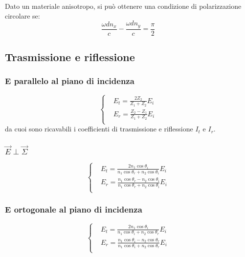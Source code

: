 \documentclass{article}
\begin{document}
Dato un materiale anisotropo, si può ottenere una condizione di polarizzazione circolare se:
\begin{equation}
    \frac{\omega d n_x}{c} -  \frac{\omega d n_y}{c}= \frac{\pi}{2}
\end{equation}


\subsection{Trasmissione e riflessione}
\subsubsection{E parallelo al piano di incidenza}
\begin{equation}
    \left\{
    \begin{aligned}
        & E_t= \frac{2Z_2}{Z_1+Z_2}E_i \\
        & E_r= \frac{Z_2-Z_1}{Z_1+Z_2}E_i\\
    \end{aligned}
    \right.
\end{equation}
da cuoi sono ricavabili i coefficienti di trasmissione e riflessione $I_t$ e $I_r$.

\subsubsection{$\Vec{E}\perp\Vec{\Sigma}$ }
\begin{equation}
    \left\{
    \begin{aligned}
        & E_t= \frac{2n_1\cos{\theta_i}}{n_1\cos{\theta_r}+n_2\cos{\theta_i}}E_i \\
        & E_r= \frac{n_1\cos{\theta_r}-n_2\cos{\theta_i}}{n_1\cos{\theta_r}+n_2\cos{\theta_i}} E_i\\
    \end{aligned}
    \right.
\end{equation}

\subsubsection{E ortogonale al piano di incidenza}
\begin{equation}
    \left\{
    \begin{aligned}
        & E_t= \frac{2n_1\cos{\theta_i}}{n_1\cos{\theta_i}+n_2\cos{\theta_r}}E_i \\
        & E_r= \frac{n_1\cos{\theta_i}-n_2\cos{\theta_r}}{n_1\cos{\theta_i}+n_2\cos{\theta_r}} E_i\\
    \end{aligned}
    \right.
\end{equation}
\end{document}
